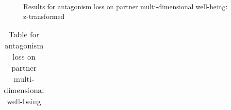 \documentclass[
  singlecolumn]{article}
\begin{document}
\begin{figure}


\caption{\label{fig-results-antagonism-loss}Results for antagonism loss
on partner multi-dimensional well-being: z-transformed}

\end{figure}%

\newpage{}

\begin{longtable}[]{@{}
  >{\raggedright\arraybackslash}p{}
  >{\raggedleft\arraybackslash}p{}
  >{\raggedleft\arraybackslash}p{}
  >{\raggedleft\arraybackslash}p{}
  >{\raggedleft\arraybackslash}p{}
  >{\raggedleft\arraybackslash}p{}@{}}

\caption{\label{tbl-results-antagonism-loss}Table for antagonism loss on
partner multi-dimensional well-being}

\tabularnewline


\end{longtable}
\end{document}
